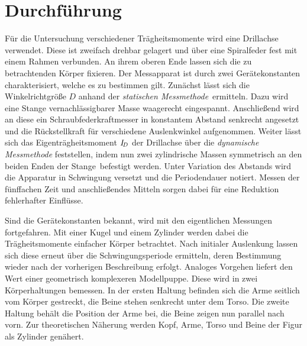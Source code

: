 \newpage

\section{Durchführung}
\label{sec:durchführung}

Für die Untersuchung verschiedener Trägheitsmomente wird eine Drillachse verwendet. Diese ist zweifach drehbar gelagert
und über eine Spiralfeder fest mit einem Rahmen verbunden. An ihrem oberen Ende lassen sich die zu betrachtenden Körper
fixieren. Der Messapparat ist durch zwei Gerätekonstanten charakterisiert, welche es zu bestimmen gilt. Zunächst lässt
sich die Winkelrichtgröße $D$ anhand der \textit{statischen Messmethode}~ermitteln. Dazu wird eine Stange
vernachlässigbarer Masse waagerecht eingespannt. Anschließend wird an diese ein Schraubfederkraftmesser
in konstantem Abstand senkrecht angesetzt und die Rückstellkraft für verschiedene Auslenkwinkel aufgenommen.
Weiter lässt sich das Eigenträgheitsmoment $I_{\hspace{-0.3ex}D}$ der Drillachse über die \textit{dynamische Messmethode}
feststellen, indem nun zwei zylindrische Massen symmetrisch an den beiden Enden der Stange~befestigt werden. Unter Variation
des Abstands wird die Apparatur in Schwingung versetzt und die Periodendauer notiert. Messen der fünffachen Zeit und
anschließendes Mitteln sorgen dabei für eine Reduktion fehlerhafter Einflüsse.

Sind die Gerätekonstanten bekannt, wird mit den eigentlichen Messungen fortgefahren. Mit einer Kugel und einem Zylinder
werden dabei die Trägheitsmomente einfacher Körper betrachtet. Nach initialer Auslenkung lassen sich diese erneut über die
Schwingungsperiode ermitteln, deren Bestimmung wieder nach der vorherigen Beschreibung erfolgt. Analoges Vorgehen
liefert den Wert einer geometrisch komplexeren Modellpuppe. Diese wird in zwei Körperhaltungen bemessen. In der ersten
Haltung befinden sich die Arme seitlich vom Körper gestreckt, die Beine stehen senkrecht unter dem Torso. Die zweite Haltung
behält die Position der Arme bei, die Beine zeigen nun parallel nach vorn. Zur theoretischen Näherung werden Kopf, Arme,
Torso und Beine der Figur als Zylinder genähert.

\newpage
